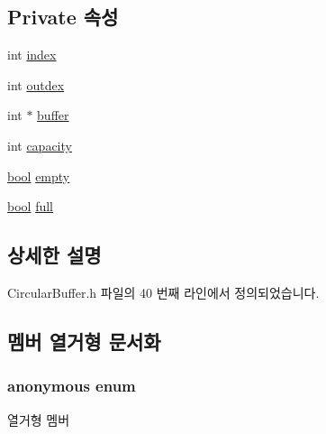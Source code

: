 \subsection*{Private 속성}
\begin{DoxyCompactItemize}
\item 
int \hyperlink{class_circular_buffer_a750b5d744c39a06bfb13e6eb010e35d0}{index}
\item 
int \hyperlink{class_circular_buffer_a1dc0e18118d416f24b42621f06cda31d}{outdex}
\item 
int $\ast$ \hyperlink{class_circular_buffer_a74c07922a00b8d07d761cfc6e03ae354}{buffer}
\item 
int \hyperlink{class_circular_buffer_adbe66a087ac3fd4a5b0566f64ca2d12b}{capacity}
\item 
\hyperlink{avb__gptp_8h_af6a258d8f3ee5206d682d799316314b1}{bool} \hyperlink{class_circular_buffer_a9625b002313a3fef67010c74415e5911}{empty}
\item 
\hyperlink{avb__gptp_8h_af6a258d8f3ee5206d682d799316314b1}{bool} \hyperlink{class_circular_buffer_a19f31d9744c12503a9cbdaa1fd3a9848}{full}
\end{DoxyCompactItemize}


\subsection{상세한 설명}


Circular\+Buffer.\+h 파일의 40 번째 라인에서 정의되었습니다.



\subsection{멤버 열거형 문서화}
\subsubsection[{\texorpdfstring{anonymous enum}{anonymous enum}}]{\setlength{\rightskip}{0pt plus 5cm}anonymous enum\hspace{0.3cm}{\ttfamily [private]}}\hypertarget{class_circular_buffer_a39b4e25c4e8f5fed29720be17a532fa8}{}\label{class_circular_buffer_a39b4e25c4e8f5fed29720be17a532fa8}
\begin{Desc}
\item[열거형 멤버]\par
\begin{description}
\item[{\em 
C\+A\+P\+A\+C\+I\+TY\hypertarget{class_circular_buffer_a39b4e25c4e8f5fed29720be17a532fa8ab7dda006facfb86f75aa6e0210a77448}{}\label{class_circular_buffer_a39b4e25c4e8f5fed29720be17a532fa8ab7dda006facfb86f75aa6e0210a77448}
}]\end{description}
\end{Desc}


